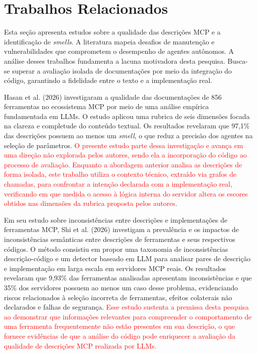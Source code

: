 \section{Trabalhos Relacionados}
\label{sec:trabalhos_relacionados}

Esta seção apresenta estudos sobre a qualidade das descrições MCP e a identificação de \textit{smells}. A literatura mapeia desafios de manutenção e vulnerabilidades que comprometem o desempenho de agentes autônomos. A análise desses trabalhos fundamenta a lacuna motivadora desta pesquisa. Busca-se superar a avaliação isolada de documentações por meio da integração do código, garantindo a fidelidade entre o texto e a implementação real.

Hasan et al. (2026) \nocite{2026arXiv260214878M} investigaram a qualidade das documentações de 856 ferramentas no ecossistema MCP por meio de uma análise empírica fundamentada em LLMs. O estudo aplicou uma rubrica de seis dimensões focada na clareza e completude do conteúdo textual. Os resultados revelaram que 97,1\% das descrições possuem ao menos um \textit{smell}, o que reduz a precisão dos agentes na seleção de parâmetros. \textcolor{red}{O presente estudo parte dessa investigação e avança em uma direção não explorada pelos autores, sendo ela a incorporação do
código ao processo de avaliação. Enquanto a abordagem anterior analisa as descrições de forma isolada, este trabalho utiliza o contexto técnico, extraído via grafos de chamadas, para confrontar a intenção declarada com a implementação real, verificando em que medida o acesso à
lógica interna do servidor altera os escores obtidos nas dimensões da rubrica proposta pelos autores}.

Em seu estudo sobre inconsistências entre descrições e implementações de ferramentas MCP, Shi et al. (2026) \nocite{shi2026description} investigam a prevalência e os impactos de inconsistências semânticas entre descrições de ferramentas e seus respectivos códigos. O método consistiu em propor uma taxonomia de inconsistências descrição-código e um detector baseado em LLM para analisar pares de descrição e implementação em larga escala em servidores MCP reais. Os resultados revelaram que 9,93\% das ferramentas analisadas apresentam inconsistências e que 35\% dos servidores possuem ao menos um caso desse problema, evidenciando riscos relacionados à seleção incorreta de ferramentas, efeitos colaterais não declarados e falhas de segurança. \textcolor{red}{Esse estudo sustenta a premissa desta pesquisa ao demonstrar que informações relevantes para compreender o comportamento de uma ferramenta frequentemente não estão presentes em sua descrição, o que fornece evidências de que a análise do código pode enriquecer a avaliação da qualidade de descrições MCP realizada por LLMs.}

